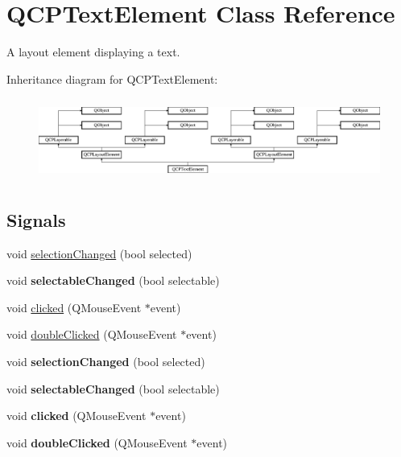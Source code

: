 \hypertarget{class_q_c_p_text_element}{}\section{Q\+C\+P\+Text\+Element Class Reference}
\label{class_q_c_p_text_element}


A layout element displaying a text.  


Inheritance diagram for Q\+C\+P\+Text\+Element\+:\begin{figure}[H]
\begin{center}
\leavevmode
\includegraphics[height=2.713178cm]{class_q_c_p_text_element}
\end{center}
\end{figure}
\subsection*{Signals}
\begin{DoxyCompactItemize}
\item 
void \hyperlink{class_q_c_p_text_element_a49f45b87ee9c1fe866c2cdd12af17a9a}{selection\+Changed} (bool selected)
\item 
\mbox{\label{class_q_c_p_text_element_ac4567260b52d02bfbad63357d13986c5}} 
void {\bfseries selectable\+Changed} (bool selectable)
\item 
void \hyperlink{class_q_c_p_text_element_ad2246a0e701c0655623f048737298334}{clicked} (Q\+Mouse\+Event $\ast$event)
\item 
void \hyperlink{class_q_c_p_text_element_a9c6fd27ae8a7c3a02df7a6bbd3509e40}{double\+Clicked} (Q\+Mouse\+Event $\ast$event)
\item 
\mbox{\label{class_q_c_p_text_element_a49f45b87ee9c1fe866c2cdd12af17a9a}} 
void {\bfseries selection\+Changed} (bool selected)
\item 
\mbox{\label{class_q_c_p_text_element_ac4567260b52d02bfbad63357d13986c5}} 
void {\bfseries selectable\+Changed} (bool selectable)
\item 
\mbox{\label{class_q_c_p_text_element_ad2246a0e701c0655623f048737298334}} 
void {\bfseries clicked} (Q\+Mouse\+Event $\ast$event)
\item 
\mbox{\label{class_q_c_p_text_element_a9c6fd27ae8a7c3a02df7a6bbd3509e40}} 
void {\bfseries double\+Clicked} (Q\+Mouse\+Event $\ast$event)
\end{DoxyCompactItemize}
